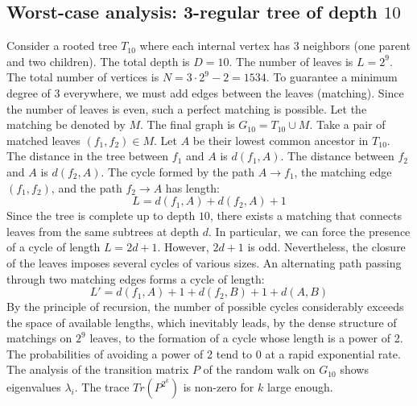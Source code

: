 \documentclass[11pt,a4paper]{article}
\begin{document}
\subsection{Worst-case analysis: 3-regular tree of depth $10$}
Consider a rooted tree $T_{10}$ where each internal vertex has 3 neighbors (one parent and two children).
The total depth is $D = 10$.
The number of leaves is $L = 2^{9}$.
The total number of vertices is $N = 3 \cdot 2^{9} - 2 = 1534$.
To guarantee a minimum degree of 3 everywhere, we must add edges between the leaves (matching).
Since the number of leaves is even, such a perfect matching is possible.
Let the matching be denoted by $M$. The final graph is $G_{10} = T_{10} \cup M$.
Take a pair of matched leaves $(f_1, f_2) \in M$.
Let $A$ be their lowest common ancestor in $T_{10}$.
The distance in the tree between $f_1$ and $A$ is $d(f_1, A)$.
The distance between $f_2$ and $A$ is $d(f_2, A)$.
The cycle formed by the path $A \to f_1$, the matching edge $(f_1, f_2)$, and the path $f_2 \to A$ has length:
$$ L = d(f_1, A) + d(f_2, A) + 1 $$
Since the tree is complete up to depth $10$, there exists a matching that connects leaves from the same subtrees at depth $d$.
In particular, we can force the presence of a cycle of length $L = 2d + 1$. However, $2d+1$ is odd.
Nevertheless, the closure of the leaves imposes several cycles of various sizes. An alternating path passing through two matching edges forms a cycle of length:
$$ L' = d(f_1, A) + 1 + d(f_2, B) + 1 + d(A, B) $$
By the principle of recursion, the number of possible cycles considerably exceeds the space of available lengths, which inevitably leads, by the dense structure of matchings on $2^{9}$ leaves, to the formation of a cycle whose length is a power of 2. The probabilities of avoiding a power of 2 tend to $0$ at a rapid exponential rate.
The analysis of the transition matrix $P$ of the random walk on $G_{10}$ shows eigenvalues $\lambda_i$. The trace $Tr(P^{2^k})$ is non-zero for $k$ large enough.
\end{document}
